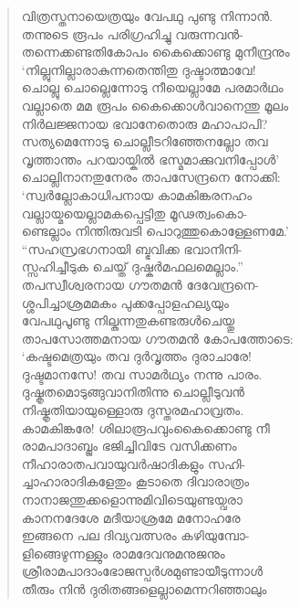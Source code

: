 \begin{verse}
വിത്രസ്തനായെത്രയും വേപഥു പുണ്ടു നിന്നാന്‍.\\
തന്നുടെ രൂപം പരിഗ്രഹിച്ചു വരുന്നവന്‍-\\
തന്നെക്കണ്ടതികോപം കൈക്കൊണ്ടു മുനീന്ദ്രനും\\
‘നില്ലുനില്ലാരാകുന്നതെന്തിതു ദുഷ്ടാത്മാവേ!\\
ചൊല്ലു ചൊല്ലെന്നോടു നീയെല്ലാമേ പരമാര്‍ഥം\\
വല്ലാതെ മമ രൂപം കൈക്കൊള്‍വാനെന്തു മൂലം\\
നിര്‍ലജ്ജനായ ഭവാനേതൊരു മഹാപാപി?\\
സത്യമെന്നോടു ചൊല്ലീടറിഞ്ഞേനല്ലോ തവ\\
വൃത്താന്തം പറയായ്കില്‍ ഭസ്മമാക്കുവനിപ്പോള്‍’\\
ചൊല്ലിനാനതുനേരം താപസേന്ദ്രനെ നോക്കി:\\
‘സ്വര്‍ല്ലോകാധിപനായ കാമകിങ്കരനഹം\\
വല്ലായ്മയെല്ലാമകപ്പെട്ടിതു മൂഢത്വംകൊ-\\
ണ്ടെല്ലാം നിന്തിരുവടി പൊറുത്തുകൊള്ളേണമേ.’\\
“സഹസ്രഭഗനായി ബ്ഭവിക്ക ഭവാനിനി-\\
സ്സഹിച്ചീടുക ചെയ്ത് ദുഷ്കര്‍മഫലമെല്ലാം.”\\
തപസ്വീശ്വരനായ ഗൗതമന്‍ ദേവേന്ദ്രനെ-\\
ശ്ശപിച്ചാശ്രമമകം പുക്കപ്പോളഹല്യയും\\
വേപഥുപൂണ്ടു നില്കുന്നതുകണ്ടരുള്‍ചെയ്തു\\
താപസോത്തമനായ ഗൗതമന്‍ കോപത്തോടെ:\\
‘കഷ്ടമെത്രയും തവ ദുര്‍വൃത്തം ദുരാചാരേ!\\
ദുഷ്ടമാനസേ! തവ സാമര്‍ഥ്യം നന്നു പാരം.\\
ദുഷ്കൃതമൊടുങ്ങുവാനിതിന്നു ചൊല്ലീടുവന്‍\\
നിഷ്കൃതിയായുള്ളൊരു ദുസ്തരമഹാവ്രതം.\\
കാമകിങ്കരേ! ശിലാരൂപവുംകൈക്കൊണ്ടു നീ\\
രാമപാദാബ്ജം ഭജിച്ചിവിടേ വസിക്കണം\\
നീഹാരാതപവായുവര്‍ഷാദികളും സഹി-\\
ച്ചാഹാരാദികളേതും കൂടാതെ ദിവാരാത്രം\\
നാനാജന്തുക്കളൊന്നുമിവിടെയുണ്ടയ്വരാ\\
കാനനദേശേ മദീയാശ്രമേ മനോഹരേ\\
ഇങ്ങനെ പല ദിവ്യവത്സരം കഴിയുമ്പോ-\\
ളിങ്ങെഴുന്നള്ളും രാമദേവനുമനുജനും\\
ശ്രീരാമപാദാംഭോജസ്പര്‍ശമുണ്ടായീടുന്നാള്‍\\
തീരും നിന്‍ ദുരിതങ്ങളെല്ലാമെന്നറിഞ്ഞാലും\\

\end{verse}
